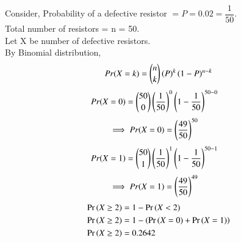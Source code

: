 Consider, Probability of a defective resistor 
$= P   = 0.02 = \dfrac{1}{50}$. \\
Total number of resistors = n = 50. \\
Let X be number of defective resistors. \\
By Binomial distribution, \\
\begin{align}
Pr(X = k) = \binom{n}{k}\left(P\right)^k\left(1 - P\right)^{n-k} 
\end{align}
\begin{align}
Pr(X = 0) &= \binom{50}{0}\left(\dfrac{1}{50}\right)^0\left(1 - \dfrac{1}{50}\right)^{50-0} 
\end{align}
\begin{align}
\implies Pr(X = 0) &= \left(\dfrac{49}{50}\right)^{50} 
\end{align}
\begin{align}
Pr(X = 1) &= \binom{50}{1}\left(\dfrac{1}{50}\right)^1\left(1 - \dfrac{1}{50}\right)^{50-1} 
\end{align}
\begin{align}
\implies Pr(X = 1) &= \left(\dfrac{49}{50}\right)^{49}
\end{align}
\begin{align*}
\Pr{(X \ge 2)} &= 1 - \Pr{(X < 2)} \\
\Pr{(X \ge 2)} &= 1 - \left(\Pr{(X = 0)} + \Pr{(X = 1)}\right) \\
\Pr{(X \ge 2)} &= 0.2642 
\end{align*}